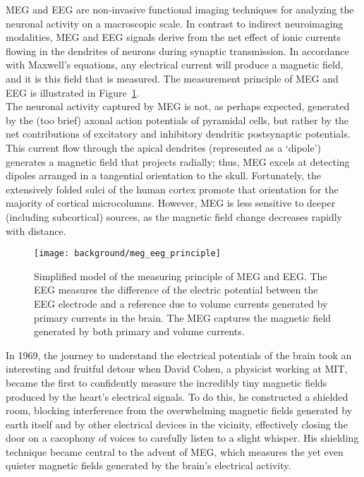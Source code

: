 MEG and EEG are non-invasive functional imaging techniques for analyzing the neuronal activity on a macroscopic scale. In contrast to indirect neuroimaging modalities, MEG and EEG signals derive from the net effect of ionic currents flowing in the dendrites of neurons during synaptic transmission. In accordance with Maxwell's equations, any electrical current will produce a magnetic field, and it is this field that is measured. The measurement principle of MEG and EEG is illustrated in Figure~\ref{fig:meg_eeg_principle}.\\

The neuronal activity captured by MEG is not, as perhaps expected, generated by the (too brief) axonal action potentials of pyramidal cells, but rather by the net contributions of excitatory and inhibitory dendritic postsynaptic potentials. This current flow through the apical dendrites (represented as a ‘dipole’) generates a magnetic field that projects radially; thus, MEG excels at detecting dipoles arranged in a tangential orientation to the skull. Fortunately, the extensively folded sulci of the human cortex promote that orientation for the majority of cortical microcolumns. However, MEG is less sensitive to deeper (including subcortical) sources, as the magnetic field change decreases rapidly with distance.\\

\begin{figure}
	\texttt{[image: background/meg\_eeg\_principle]}
    \caption{Simplified model of the measuring principle of MEG and EEG. The EEG measures the difference of the electric potential between the EEG electrode and a reference due to volume currents generated by primary currents in the brain. The
MEG captures the magnetic field generated by both primary and volume currents.
    }
    \label{fig:meg_eeg_principle}
\end{figure}

In 1969, the journey to understand the electrical potentials of the brain took an interesting and fruitful detour when David Cohen, a physicist working at MIT, became the first to confidently measure the incredibly tiny magnetic fields produced by the heart's electrical signals. To do this, he constructed a shielded room, blocking interference from the overwhelming magnetic fields generated by earth itself and by other electrical devices in the vicinity, effectively closing the door on a cacophony of voices to carefully listen to a slight whisper. His shielding technique became central to the advent of MEG, which measures the yet even quieter magnetic fields generated by the brain's electrical activity.\\ %

